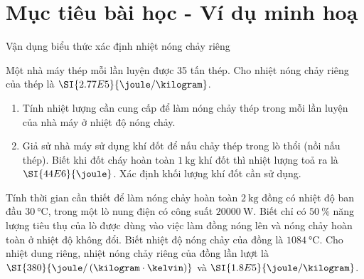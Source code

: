\section{Mục tiêu bài học - Ví dụ minh hoạ}
\begin{dang}{Vận dụng biểu thức xác định nhiệt nóng chảy riêng}
	{Một nhà máy thép mỗi lần luyện được 35 tấn thép. Cho nhiệt nóng chảy riêng của thép là $\SI{2.77E5}{\joule/\kilogram}$.
		\begin{enumerate}[label=\alph*)]
			\item Tính nhiệt lượng cần cung cấp để làm nóng chảy thép trong mỗi lần luyện của nhà máy ở nhiệt độ nóng chảy.
			\item Giả sử nhà máy sử dụng khí đốt để nấu chảy thép trong lò thổi (nồi nấu thép). Biết khi đốt cháy hoàn toàn $\SI{1}{\kilogram}$ khí đốt thì nhiệt lượng toả ra là $\SI{44E6}{\joule}$. Xác định khối lượng khí đốt cần sử dụng.
		\end{enumerate}
	
}
{
}

{Tính thời gian cần thiết để làm nóng chảy hoàn toàn $\SI{2}{\kilogram}$ đồng có nhiệt độ ban đầu $\SI{30}{\celsius}$, trong một lò nung điện có công suất $\SI{20000}{\watt}$. Biết chỉ có $\SI{50}{\percent}$ năng lượng tiêu thụ của lò được dùng vào việc làm đồng nóng lên và nóng chảy hoàn toàn ở nhiệt độ không đổi. Biết nhiệt độ nóng chảy của đồng là $\SI{1084}{\celsius}$. Cho nhiệt dung riêng, nhiệt nóng chảy riêng của đồng lần lượt là $\SI{380}{\joule/\left(\kilogram\cdot\kelvin\right)}$ và $\SI{1.8E5}{\joule/\kilogram}$.

}
{
}

\end{dang}
